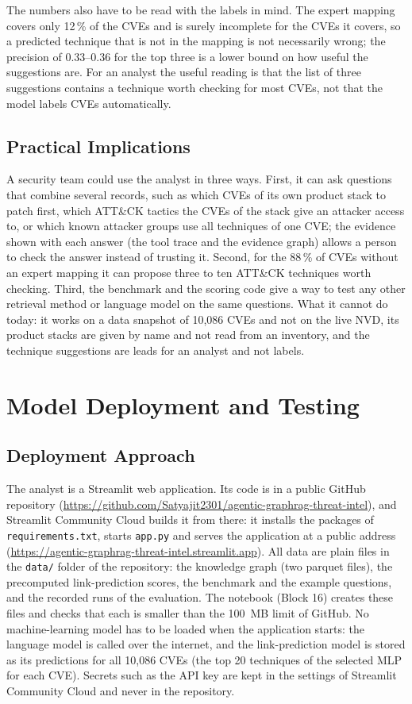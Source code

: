 \documentclass[12pt, a4paper]{article}
\newcommand{\repourl}{https://github.com/Satyajit2301/agentic-graphrag-threat-intel}
\newcommand{\appurl}{https://agentic-graphrag-threat-intel.streamlit.app}
\begin{document}
The numbers also have to be read with the labels in mind. The expert mapping covers only 12\,\% of the CVEs and is surely incomplete for the CVEs it covers, so a predicted technique that is not in the mapping is not necessarily wrong; the precision of 0.33--0.36 for the top three is a lower bound on how useful the suggestions are. For an analyst the useful reading is that the list of three suggestions contains a technique worth checking for most CVEs, not that the model labels CVEs automatically.
\subsection{Practical Implications}
A security team could use the analyst in three ways. First, it can ask questions that combine several records, such as which CVEs of its own product stack to patch first, which ATT\&CK tactics the CVEs of the stack give an attacker access to, or which known attacker groups use all techniques of one CVE; the evidence shown with each answer (the tool trace and the evidence graph) allows a person to check the answer instead of trusting it. Second, for the 88\,\% of CVEs without an expert mapping it can propose three to ten ATT\&CK techniques worth checking. Third, the benchmark and the scoring code give a way to test any other retrieval method or language model on the same questions. What it cannot do today: it works on a data snapshot of 10,086 CVEs and not on the live NVD, its product stacks are given by name and not read from an inventory, and the technique suggestions are leads for an analyst and not labels.

\section{Model Deployment and Testing}
\subsection{Deployment Approach}
The analyst is a Streamlit web application. Its code is in a public GitHub repository (\url{\repourl}), and Streamlit Community Cloud builds it from there: it installs the packages of \texttt{requirements.txt}, starts \texttt{app.py} and serves the application at a public address (\url{\appurl}). All data are plain files in the \texttt{data/} folder of the repository: the knowledge graph (two parquet files), the precomputed link-prediction scores, the benchmark and the example questions, and the recorded runs of the evaluation. The notebook (Block 16) creates these files and checks that each is smaller than the 100~MB limit of GitHub. No machine-learning model has to be loaded when the application starts: the language model is called over the internet, and the link-prediction model is stored as its predictions for all 10,086 CVEs (the top 20 techniques of the selected MLP for each CVE). Secrets such as the API key are kept in the settings of Streamlit Community Cloud and never in the repository.
\end{document}
